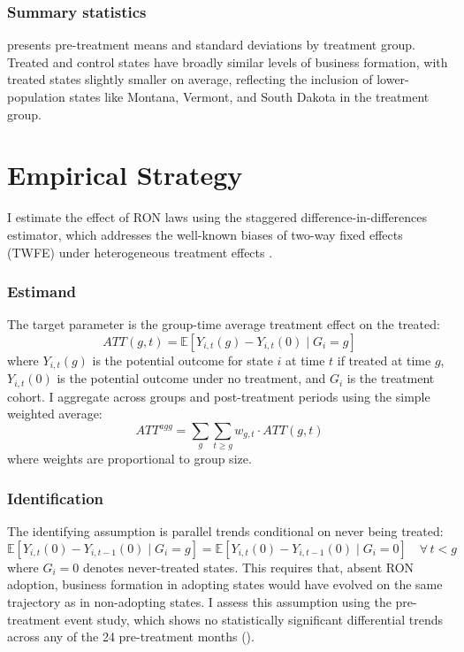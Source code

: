 \documentclass[12pt]{article}
\newcommand{\E}{\mathbb{E}}
\begin{document}
\subsubsection*{Summary statistics}  presents pre-treatment means and standard deviations by treatment group. Treated and control states have broadly similar levels of business formation, with treated states slightly smaller on average, reflecting the inclusion of lower-population states like Montana, Vermont, and South Dakota in the treatment group.




\section{Empirical Strategy}

I estimate the effect of RON laws using the \citet{callaway2021difference} staggered difference-in-differences estimator, which addresses the well-known biases of two-way fixed effects (TWFE) under heterogeneous treatment effects \citep{goodman2021difference, sun2021estimating, dechaisemartin2020two, borusyak2024revisiting}.

\subsubsection*{Estimand} The target parameter is the group-time average treatment effect on the treated:
\begin{equation}
ATT(g,t) = \E[Y_{i,t}(g) - Y_{i,t}(0) \mid G_i = g]
\end{equation}
where $Y_{i,t}(g)$ is the potential outcome for state $i$ at time $t$ if treated at time $g$, $Y_{i,t}(0)$ is the potential outcome under no treatment, and $G_i$ is the treatment cohort. I aggregate across groups and post-treatment periods using the simple weighted average:
\begin{equation}
ATT^{agg} = \sum_{g} \sum_{t \geq g} w_{g,t} \cdot ATT(g,t)
\end{equation}
where weights are proportional to group size.

\subsubsection*{Identification} The identifying assumption is parallel trends conditional on never being treated:
\begin{equation}
\E[Y_{i,t}(0) - Y_{i,t-1}(0) \mid G_i = g] = \E[Y_{i,t}(0) - Y_{i,t-1}(0) \mid G_i = 0] \quad \forall\, t < g
\end{equation}
where $G_i = 0$ denotes never-treated states. This requires that, absent RON adoption, business formation in adopting states would have evolved on the same trajectory as in non-adopting states. I assess this assumption using the pre-treatment event study, which shows no statistically significant differential trends across any of the 24 pre-treatment months ().
\end{document}
